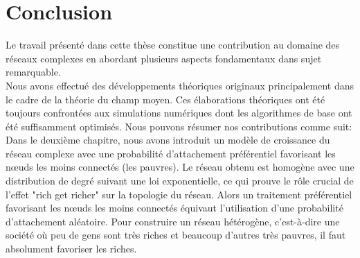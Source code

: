 
\chapter*{Conclusion}
 


Le travail présenté dans cette thèse constitue une contribution au domaine des réseaux complexes en abordant plusieurs aspects fondamentaux dans sujet remarquable.\\
Nous avons effectué des développements théoriques originaux principalement dans le cadre de la théorie du champ moyen. Ces élaborations théoriques ont été toujours confrontées aux simulations numériques dont les algorithmes de base ont été suffisamment optimisés. Nous pouvons résumer nos contributions comme suit: \\
Dans le deuxième chapitre, nous avons introduit un modèle de croissance du réseau complexe avec une probabilité d'attachement préférentiel favorisant les nœuds les moins connectés (les pauvres). Le réseau obtenu est homogène avec une distribution de degré suivant une loi exponentielle, ce qui prouve le rôle crucial de l'effet "rich get richer" sur la topologie du réseau. Alors un traitement préférentiel favorisant les nœuds les moins connectés équivaut l'utilisation d'une probabilité d'attachement aléatoire. Pour construire un réseau hétérogène, c'est-à-dire une société où peu de gens sont très riches et beaucoup d'autres très pauvres, il faut absolument favoriser les riches.



